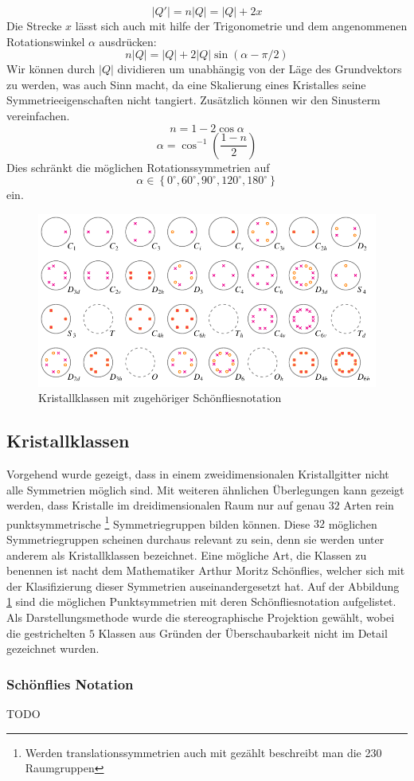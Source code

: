  \[
    |Q'| = n|Q| = |Q| + 2x
 \]
 Die Strecke $x$ lässt sich auch mit hilfe der Trigonometrie und dem angenommenen Rotationswinkel $\alpha$ ausdrücken:
 \[
    n|Q| = |Q| + 2|Q|\sin(\alpha - \pi/2)
 \]
 Wir können durch $|Q|$ dividieren um unabhängig von der Läge des Grundvektors zu werden, 
 was auch Sinn macht, da eine Skalierung eines Kristalles seine Symmetrieeigenschaften nicht tangiert. 
 Zusätzlich können wir den Sinusterm vereinfachen.
 \[
     n = 1 - 2\cos\alpha
     
 \]
 \[
     \alpha = \cos^{-1}\left(\frac{1-n}{2}\right)
 \]
 Dies schränkt die möglichen Rotationssymmetrien auf 
 \[
     \alpha \in \left\{ 0^\circ, 60^\circ, 90^\circ, 120^\circ, 180^\circ\right\}
 \]
ein.

\begin{figure}
    \centering
    \includegraphics[]{papers/punktgruppen/figures/projections}
    \caption{Kristallklassen mit zugehöriger Schönfliesnotation}
    \label{fig:punktgruppen:Kristallkassen}
\end{figure}

\subsection{Kristallklassen}
Vorgehend wurde gezeigt, dass in einem zweidimensionalen Kristallgitter nicht alle Symmetrien möglich sind.
Mit weiteren ähnlichen Überlegungen kann gezeigt werden, dass Kristalle im dreidimensionalen Raum
nur auf genau $32$ Arten rein punktsymmetrische
\footnote{Werden translationssymmetrien auch mit gezählt beschreibt man die 230 Raumgruppen} 
Symmetriegruppen bilden können.
Diese $32$ möglichen Symmetriegruppen scheinen durchaus relevant zu sein, denn sie werden unter anderem als Kristallklassen bezeichnet.
Eine mögliche Art, die Klassen zu benennen ist nacht dem Mathematiker Arthur Moritz Schönflies, 
welcher sich mit der Klasifizierung dieser Symmetrien auseinandergesetzt hat.
Auf der Abbildung \ref{fig:punktgruppen:Kristallkassen} sind die möglichen Punktsymmetrien mit deren Schönfliesnotation aufgelistet.
Als Darstellungsmethode wurde die stereographische Projektion gewählt, wobei die gestrichelten $5$ Klassen aus Gründen der Überschaubarkeit nicht im Detail gezeichnet wurden. 


\subsubsection{Schönflies Notation}
TODO 



